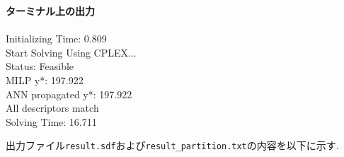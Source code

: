 \documentclass[11pt, titlepage, dvipdfmx, twoside]{jarticle}
\begin{document}
\bigskip

\begin{oframed}
{\bf ターミナル上の出力}\\\\
Initializing Time: 0.809  \\
Start Solving Using CPLEX...\\
Status: Feasible 		\\
MILP y*: 197.922 		\\
ANN propagated y*: 197.922 \\
All descriptors match    	\\
Solving Time: 16.711       
\end{oframed}

出力ファイル{\tt result.sdf}および{\tt result\_partition.txt}の内容を以下に示す. 

\bigskip
\end{document}
